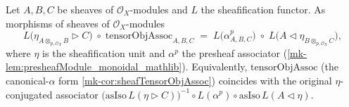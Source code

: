 \begin{lemma}\label{mk-lem:tensorObjAssoc_eta_factor_sheaf}
  \leanok

  Let \(A, B, C\) be sheaves of \(\mathcal{O}_X\)-modules and \(L\) the sheafification
  functor. As morphisms of sheaves of \(\mathcal{O}_X\)-modules
  \[
    L\bigl(\eta_{A \otimes_{p,\mathcal{O}_X} B} \rhd C\bigr)
      \;\circ\; \mathrm{tensorObjAssoc}_{A,B,C}
    \;=\;
    L\bigl(\alpha^{p}_{A,B,C}\bigr)
      \;\circ\; L\bigl(A \lhd \eta_{B \otimes_{p,\mathcal{O}_X} C}\bigr),
  \]
  where \(\eta\) is the sheafification unit and \(\alpha^{p}\) the presheaf
  associator (\ref{mk-lem:presheafModule_monoidal_mathlib}). Equivalently,
  \(\mathrm{tensorObjAssoc}\) (the canonical-\(\alpha\) form
  \ref{mk-cor:sheafTensorObjAssoc}) coincides with the original \(\eta\)-conjugated
  associator \(\bigl(\mathrm{asIso}\,L(\eta \rhd C)\bigr)^{-1}
  \circ L(\alpha^{p}) \circ \mathrm{asIso}\,L(A \lhd \eta)\).
\end{lemma}
